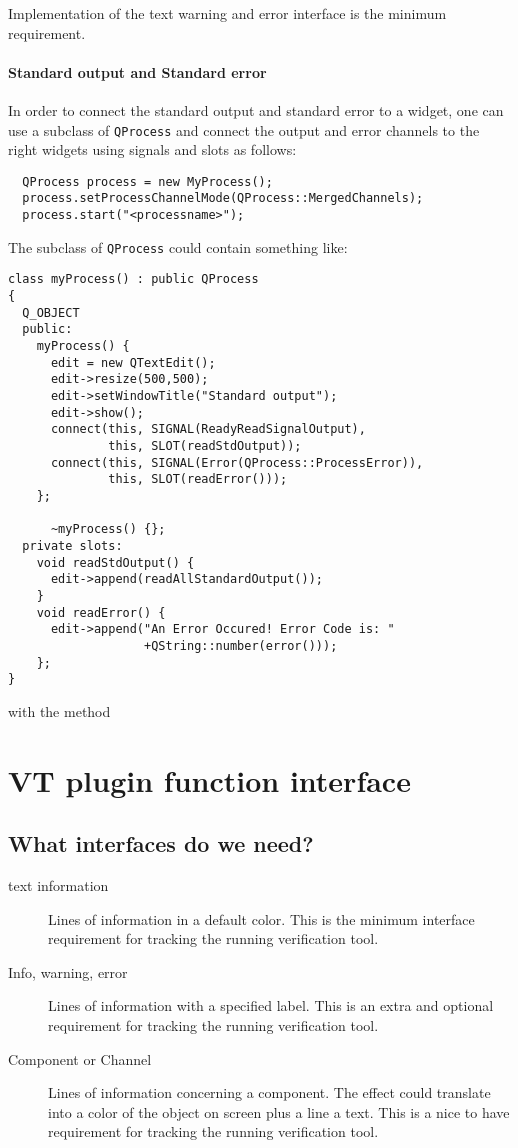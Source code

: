\documentclass[a4paper,11pt,final]{article}
\newcommand{\code}[1]{\texttt{#1}\xspace}%
\begin{document}
Implementation of the text warning and error interface is the minimum
requirement. 

\paragraph{Standard output and Standard error}
In order to connect the standard output and standard error to
a widget, one can use a subclass of \code{QProcess} and connect
the output and error channels to the right widgets using signals and
slots as follows:

\begin{lstlisting}
  QProcess process = new MyProcess();
  process.setProcessChannelMode(QProcess::MergedChannels);
  process.start("<processname>");
\end{lstlisting}

The subclass of \code{QProcess} could contain something like:

\begin{lstlisting}
class myProcess() : public QProcess
{
  Q_OBJECT
  public:
    myProcess() {
      edit = new QTextEdit();
      edit->resize(500,500);
      edit->setWindowTitle("Standard output");
      edit->show();
      connect(this, SIGNAL(ReadyReadSignalOutput), 
              this, SLOT(readStdOutput));
      connect(this, SIGNAL(Error(QProcess::ProcessError)), 
              this, SLOT(readError()));
    };
	
      ~myProcess() {};
  private slots:
    void readStdOutput() {
      edit->append(readAllStandardOutput());
    }	
    void readError() {
      edit->append("An Error Occured! Error Code is: "
                   +QString::number(error()));
    };	
}
\end{lstlisting}


with the method


\section{VT plugin function interface}

\subsection{What interfaces do we need?}

\begin{description}
	\item[text information]	Lines of information in a default color. This is the
	minimum interface requirement for tracking the running verification tool.

	\item[Info, warning, error]	Lines of information with a specified label. This is an
	extra and optional requirement for tracking the running verification tool.

	\item[Component or Channel] Lines of information concerning a component. The effect could
	translate into a color of the object on screen plus a line a text. This is a nice to have
	requirement for tracking the running verification tool.

\end{description}
\end{document}
